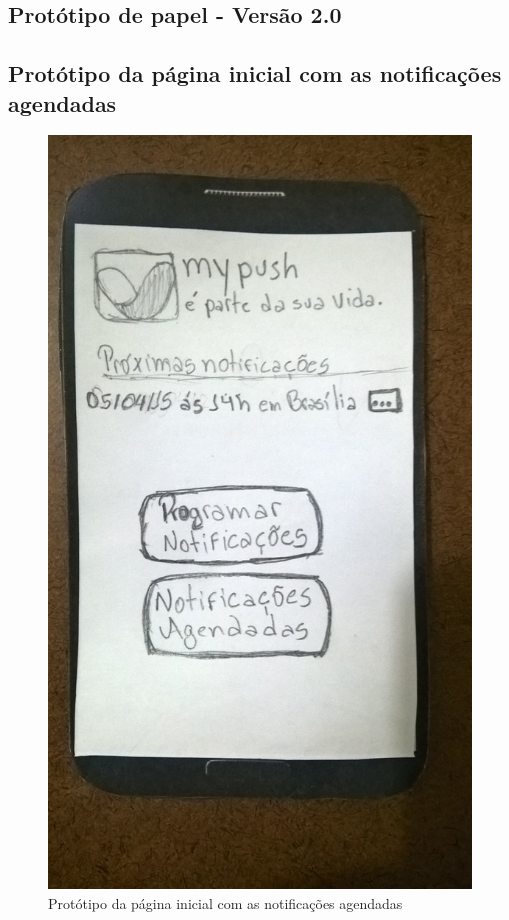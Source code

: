 \begin{anexosenv}
\chapter{Protótipo de papel - Versão 2.0}
  
  \section*{Protótipo da página inicial com as notificações agendadas}
  
    \begin{figure}[!htbp]
      \centering
      \includegraphics[scale=0.32, angle=-90]{editaveis/figuras/prototipo_papel_v2/pagina_inicial}
      \caption{Protótipo da página inicial com as notificações agendadas}
      \label{pagina_inicial_v2}
    \end{figure}
  

\end{anexosenv}
